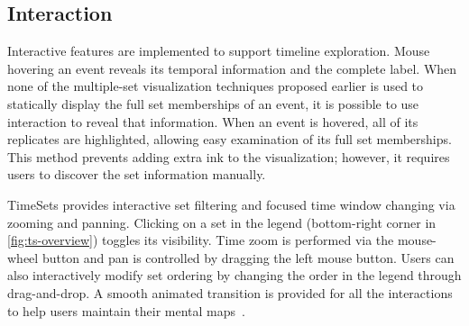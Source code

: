 \subsection{Interaction}
\label{sub:interaction}
Interactive features are implemented to support timeline exploration. Mouse hovering an event reveals its temporal information and the complete label. When none of the multiple-set visualization techniques proposed earlier is used to statically display the full set memberships of an event, it is possible to use interaction to reveal that information. When an event is hovered, all of its replicates are highlighted, allowing easy examination of its full set memberships. This method prevents adding extra ink to the visualization; however, it requires users to discover the set information manually.

TimeSets provides interactive set filtering and focused time window changing via zooming and panning. Clicking on a set in the legend (bottom-right corner in \autoref{fig:ts-overview}) toggles its visibility. Time zoom is performed via the mouse-wheel button and pan is controlled by dragging the left mouse button. Users can also interactively modify set ordering by changing the order in the legend through drag-and-drop. A smooth animated transition is provided for all the interactions to help users maintain their mental maps~\cite{Elmqvist2011}.